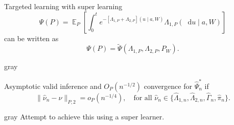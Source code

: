 \documentclass[smaller]{beamer}\usepackage{listings}
\newcommand{\E}{{\ensuremath{\mathop{{\mathbb{E}}}}}}
\newcommand*\diff{\mathop{}\!\mathrm{d}}
\newcommand\smallO{\textit{o}}
\newcommand\bigO{\textit{O}}
\newcommand{\1}{\mathds{1}}
\newcommand{\empmeas}{\ensuremath{\mathbb{P}_n}} %
\begin{document}
\begin{frame}[label={sec:orgde3c8f5}]{Targeted learning with super learning}
\begin{equation*}
  \Psi(P) = \E_{P}{
    \left[
      \int_0^t e^{-[\Lambda_{1,P}+\Lambda_{2,P}](u \mid
        a, W)} \Lambda_{1,P}(\diff u \mid a, W)
    \right]}  
\end{equation*}
can be written as
\begin{equation*}
  \Psi(P) = \tilde{\Psi}(\Lambda_{1,P}, \Lambda_{2,P}, P_W).
\end{equation*}

\vfill

\begin{beamercolorbox}[rounded=true]{gray}
\begin{center}
\end{center}
\end{beamercolorbox}

\begin{block}{}
\vspace{-.2cm}

Asymptotic valid inference and \(\bigO_P(n^{-1/2})\) convergence
for \(\hat{\Psi}_n^*\) if
\begin{equation*}
  \| \hat{\nu}_n - \nu \|_{P,2} = \smallO_P{(n^{-1/4})},
  \quad \text{for all } \hat{\nu}_n \in
  \{ \hat{\Lambda}_{1,n}, \hat{\Lambda}_{2,n}, \hat{\Gamma}_n,
  \hat{\pi}_n \}.
\end{equation*}

\pause
\end{block}

\begin{beamercolorbox}[rounded=true]{gray}
\centering Attempt to achieve this using a super learner.
\end{beamercolorbox}
\end{frame}
\end{document}
